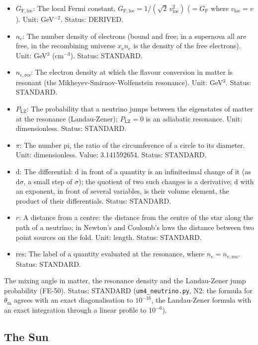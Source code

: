 \documentclass[
  10pt,
]{article}
\begin{document}
\begin{itemize}
  mass. Unit: GeV. Status: STANDARD.
\item
  \(G_{\mathrm{F,loc}}\): The local Fermi constant,
  \(G_{\mathrm{F,loc}} = 1/(\sqrt2\,v_{\mathrm{loc}}^2)\)
  (\(= G_{\mathrm{F}}\) where \(v_{\mathrm{loc}} = v\)). Unit:
  GeV\(^{-2}\). Status: DERIVED.
\item
  \(n_e\): The number density of electrons (bound and free; in a
  supernova all are free, in the recombining universe
  \(x_{\mathrm{e}}n_e\) is the density of the free electrons). Unit:
  GeV\(^3\) (cm\(^{-3}\)). Status: STANDARD.
\item
  \(n_{e,\mathrm{res}}\): The electron density at which the flavour
  conversion in matter is resonant (the Mikheyev-Smirnov-Wolfenstein
  resonance). Unit: GeV\(^3\). Status: STANDARD.
\item
  \(P_{\mathrm{LZ}}\): The probability that a neutrino jumps between the
  eigenstates of matter at the resonance (Landau-Zener);
  \(P_{\mathrm{LZ}} = 0\) is an adiabatic resonance. Unit:
  dimensionless. Status: STANDARD.
\item
  \(\pi\): The number pi, the ratio of the circumference of a circle to
  its diameter. Unit: dimensionless. Value: 3.141592654. Status:
  STANDARD.
\item
  \(\mathrm{d}\): The differential: \(\mathrm{d}\) in front of a
  quantity is an infinitesimal change of it (as \(\mathrm{d}\sigma\), a
  small step of \(\sigma\)); the quotient of two such changes is a
  derivative; \(\mathrm{d}\) with an exponent, in front of several
  variables, is their volume element, the product of their
  differentials. Status: STANDARD.
\item
  \(r\): A distance from a centre: the distance from the centre of the
  star along the path of a neutrino; in Newton's and Coulomb's laws the
  distance between two point sources on the fold. Unit: length. Status:
  STANDARD.
\item
  \(\mathrm{res}\): The label of a quantity evaluated at the resonance,
  where \(n_e = n_{e,\mathrm{res}}\). Status: STANDARD.
\end{itemize}

The mixing angle in matter, the resonance density and the Landau-Zener
jump probability (FE-50). Status: STANDARD (\texttt{um4\_neutrino.py},
N2: the formula for \(\theta_{\mathrm{m}}\) agrees with an exact
diagonalisation to \(10^{-16}\), the Landau-Zener formula with an exact
integration through a linear profile to \(10^{-6}\)).

\hypertarget{the-sun}{%
\subsection{The Sun}\label{the-sun}}
\end{document}
